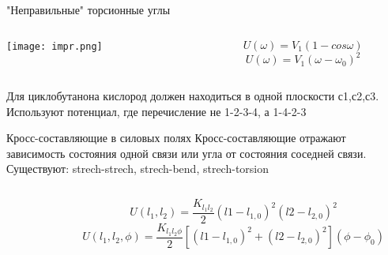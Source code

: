 \begin{frame}{"Неправильные" торсионные углы}
\begin{columns}
\begin{column}{0.5\textwidth}
\texttt{[image: impr.png]}
\end{column}
\begin{column}{0.5\textwidth} 
    \[ U(\omega)= {V_1} (1 - cos\omega ) \]
    \[ U(\omega)= {V_1} (\omega - \omega_0)^2 \]
\end{column}
\end{columns}
Для циклобутанона кислород должен находиться в одной плоскости с1,с2,с3. \\
Используют  потенциал, где перечисление не 1-2-3-4, а 1-4-2-3 
\end{frame}


\begin{frame}{Кросс-составляющие в силовых полях}
Кросс-составляющие отражают зависимость состояния одной связи или угла от состояния соседней связи. \\
Существуют: strech-strech, strech-bend, strech-torsion
\vspace{0.5cm}
\begin{columns}
\begin{column}{0.3\textwidth}
\end{column}
\begin{column}{0.7\textwidth} 
    \[ U(l_1 ,l_2)= \frac{K_{l_1 l_2}}{2} (l1 - l_{1,0})^2 (l2 - l_{2,0})^2 \]
    \[U(l_1 ,l_2,\phi)= \frac{K_{l_1 l_2 \phi }}{2} [(l1 - l_{1,0})^2 +(l2 - l_{2,0})^2](\phi -\phi_0) \]
\end{column}
\end{columns}
\end{frame}

